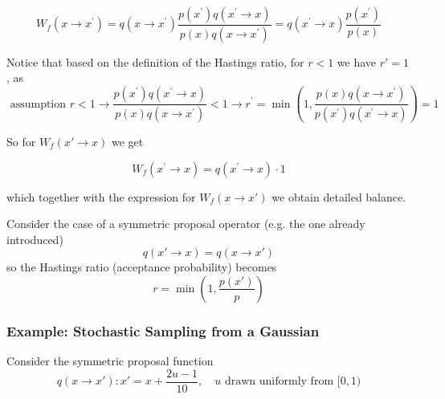 \begin{equation}
    W_f\left(x \rightarrow x^{\prime}\right)=q\left(x \rightarrow x^{\prime}\right) \frac{p\left(x^{\prime}\right) q\left(x^{\prime} \rightarrow x\right)}{p(x) q\left(x \rightarrow x^{\prime}\right)}=q\left(x^{\prime} \rightarrow x\right) \frac{p\left(x^{\prime}\right)}{p(x)}
\end{equation}

Notice that based on the definition of the Hastings ratio, for $r<1$ we have $r' = 1$, as
\begin{equation}
    \text { assumption } r<1 \rightarrow \frac{p\left(x^{\prime}\right) q\left(x^{\prime} \rightarrow x\right)}{p(x) q\left(x \rightarrow x^{\prime}\right)}<1 \rightarrow r^{\prime}=\min \left(1, \frac{p(x) q\left(x \rightarrow x^{\prime}\right)}{p\left(x^{\prime}\right) q\left(x^{\prime} \rightarrow x\right)}\right)=1
\end{equation}

So for $W_f(x' \rightarrow x)$ we get

\begin{equation}
    W_f\left(x^{\prime} \rightarrow x\right)=q\left(x^{\prime} \rightarrow x\right) \cdot 1
\end{equation}

which together with the expression for $W_f(x \rightarrow x')$ we obtain detailed balance.

Consider the case of a symmetric proposal operator (e.g. the one already introduced)
\begin{equation}
    q(x' \rightarrow x) = q(x \rightarrow x')
\end{equation}
so the Hastings ratio (acceptance probability) becomes
\begin{equation}
    r = \min{\left(1, \frac{p(x')}{p}\right)}
\end{equation}

\subsubsection{Example: Stochastic Sampling from a Gaussian}
Consider the symmetric proposal function
\begin{equation}
    q(x \rightarrow x'): x' = x + \frac{2u-1}{10}, \quad u \text{ drawn uniformly from } [0,1)
\end{equation}

